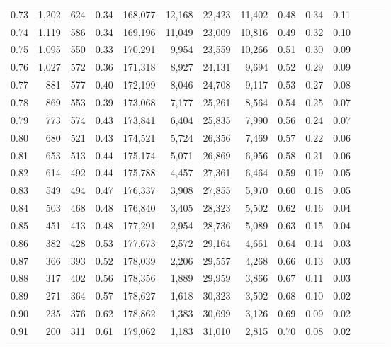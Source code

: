 \begin{tabular}{rrrrrrrrrrrrrr}
0.73 &  1,202 &  624 &  0.34 &  168,077 &   12,168 &  22,423 &  11,402 &  0.48 &  0.34 &      0.11 \\
0.74 &  1,119 &  586 &  0.34 &  169,196 &   11,049 &  23,009 &  10,816 &  0.49 &  0.32 &      0.10 \\
0.75 &  1,095 &  550 &  0.33 &  170,291 &    9,954 &  23,559 &  10,266 &  0.51 &  0.30 &      0.09 \\
0.76 &  1,027 &  572 &  0.36 &  171,318 &    8,927 &  24,131 &   9,694 &  0.52 &  0.29 &      0.09 \\
0.77 &    881 &  577 &  0.40 &  172,199 &    8,046 &  24,708 &   9,117 &  0.53 &  0.27 &      0.08 \\
0.78 &    869 &  553 &  0.39 &  173,068 &    7,177 &  25,261 &   8,564 &  0.54 &  0.25 &      0.07 \\
0.79 &    773 &  574 &  0.43 &  173,841 &    6,404 &  25,835 &   7,990 &  0.56 &  0.24 &      0.07 \\
0.80 &    680 &  521 &  0.43 &  174,521 &    5,724 &  26,356 &   7,469 &  0.57 &  0.22 &      0.06 \\
0.81 &    653 &  513 &  0.44 &  175,174 &    5,071 &  26,869 &   6,956 &  0.58 &  0.21 &      0.06 \\
0.82 &    614 &  492 &  0.44 &  175,788 &    4,457 &  27,361 &   6,464 &  0.59 &  0.19 &      0.05 \\
0.83 &    549 &  494 &  0.47 &  176,337 &    3,908 &  27,855 &   5,970 &  0.60 &  0.18 &      0.05 \\
0.84 &    503 &  468 &  0.48 &  176,840 &    3,405 &  28,323 &   5,502 &  0.62 &  0.16 &      0.04 \\
0.85 &    451 &  413 &  0.48 &  177,291 &    2,954 &  28,736 &   5,089 &  0.63 &  0.15 &      0.04 \\
0.86 &    382 &  428 &  0.53 &  177,673 &    2,572 &  29,164 &   4,661 &  0.64 &  0.14 &      0.03 \\
0.87 &    366 &  393 &  0.52 &  178,039 &    2,206 &  29,557 &   4,268 &  0.66 &  0.13 &      0.03 \\
0.88 &    317 &  402 &  0.56 &  178,356 &    1,889 &  29,959 &   3,866 &  0.67 &  0.11 &      0.03 \\
0.89 &    271 &  364 &  0.57 &  178,627 &    1,618 &  30,323 &   3,502 &  0.68 &  0.10 &      0.02 \\
0.90 &    235 &  376 &  0.62 &  178,862 &    1,383 &  30,699 &   3,126 &  0.69 &  0.09 &      0.02 \\
0.91 &    200 &  311 &  0.61 &  179,062 &    1,183 &  31,010 &   2,815 &  0.70 &  0.08 &      0.02 \\

\end{tabular}
